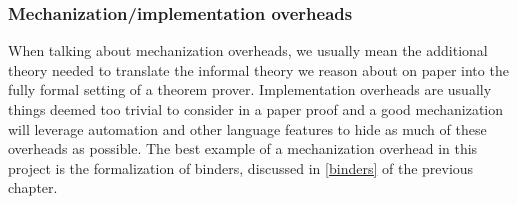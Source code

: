 \documentclass[a4paper, 12pt, twoside]{style/ociamthesis}
\theoremstyle{plain}
\theoremstyle{definition}
\theoremstyle{remark}
\begin{document}
\subsubsection{Mechanization/implementation
overheads}\label{mechanizationimplementation-overheads}

When talking about mechanization overheads, we usually mean the
additional theory needed to translate the informal theory we reason
about on paper into the fully formal setting of a theorem prover.
Implementation overheads are usually things deemed too trivial to
consider in a paper proof and a good mechanization will leverage
automation and other language features to hide as much of these
overheads as possible. The best example of a mechanization overhead in
this project is the formalization of binders, discussed in
\cref{binders} of the previous chapter.
\end{document}
